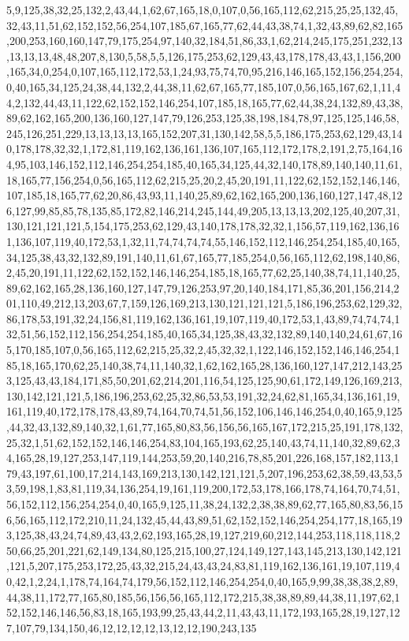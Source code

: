 5,9,125,38,32,25,132,2,43,44,1,62,67,165,18,0,107,0,56,165,112,62,215,25,25,132,45,32,43,11,51,62,152,152,56,254,107,185,67,165,77,62,44,43,38,74,1,32,43,89,62,82,165,200,253,160,160,147,79,175,254,97,140,32,184,51,86,33,1,62,214,245,175,251,232,13,13,13,13,48,48,207,8,130,5,58,5,5,126,175,253,62,129,43,43,178,178,43,43,1,156,200,165,34,0,254,0,107,165,112,172,53,1,24,93,75,74,70,95,216,146,165,152,156,254,254,0,40,165,34,125,24,38,44,132,2,44,38,11,62,67,165,77,185,107,0,56,165,167,62,1,11,44,2,132,44,43,11,122,62,152,152,146,254,107,185,18,165,77,62,44,38,24,132,89,43,38,89,62,162,165,200,136,160,127,147,79,126,253,125,38,198,184,78,97,125,125,146,58,245,126,251,229,13,13,13,13,165,152,207,31,130,142,58,5,5,186,175,253,62,129,43,140,178,178,32,32,1,172,81,119,162,136,161,136,107,165,112,172,178,2,191,2,75,164,164,95,103,146,152,112,146,254,254,185,40,165,34,125,44,32,140,178,89,140,140,11,61,18,165,77,156,254,0,56,165,112,62,215,25,20,2,45,20,191,11,122,62,152,152,146,146,107,185,18,165,77,62,20,86,43,93,11,140,25,89,62,162,165,200,136,160,127,147,48,126,127,99,85,85,78,135,85,172,82,146,214,245,144,49,205,13,13,13,202,125,40,207,31,130,121,121,121,5,154,175,253,62,129,43,140,178,178,32,32,1,156,57,119,162,136,161,136,107,119,40,172,53,1,32,11,74,74,74,74,55,146,152,112,146,254,254,185,40,165,34,125,38,43,32,132,89,191,140,11,61,67,165,77,185,254,0,56,165,112,62,198,140,86,2,45,20,191,11,122,62,152,152,146,146,254,185,18,165,77,62,25,140,38,74,11,140,25,89,62,162,165,28,136,160,127,147,79,126,253,97,20,140,184,171,85,36,201,156,214,201,110,49,212,13,203,67,7,159,126,169,213,130,121,121,121,5,186,196,253,62,129,32,86,178,53,191,32,24,156,81,119,162,136,161,19,107,119,40,172,53,1,43,89,74,74,74,132,51,56,152,112,156,254,254,185,40,165,34,125,38,43,32,132,89,140,140,24,61,67,165,170,185,107,0,56,165,112,62,215,25,32,2,45,32,32,1,122,146,152,152,146,146,254,185,18,165,170,62,25,140,38,74,11,140,32,1,62,162,165,28,136,160,127,147,212,143,253,125,43,43,184,171,85,50,201,62,214,201,116,54,125,125,90,61,172,149,126,169,213,130,142,121,121,5,186,196,253,62,25,32,86,53,53,191,32,24,62,81,165,34,136,161,19,161,119,40,172,178,178,43,89,74,164,70,74,51,56,152,106,146,146,254,0,40,165,9,125,44,32,43,132,89,140,32,1,61,77,165,80,83,56,156,56,165,167,172,215,25,191,178,132,25,32,1,51,62,152,152,146,146,254,83,104,165,193,62,25,140,43,74,11,140,32,89,62,34,165,28,19,127,253,147,119,144,253,59,20,140,216,78,85,201,226,168,157,182,113,179,43,197,61,100,17,214,143,169,213,130,142,121,121,5,207,196,253,62,38,59,43,53,53,59,198,1,83,81,119,34,136,254,19,161,119,200,172,53,178,166,178,74,164,70,74,51,56,152,112,156,254,254,0,40,165,9,125,11,38,24,132,2,38,38,89,62,77,165,80,83,56,156,56,165,112,172,210,11,24,132,45,44,43,89,51,62,152,152,146,254,254,177,18,165,193,125,38,43,24,74,89,43,43,2,62,193,165,28,19,127,219,60,212,144,253,118,118,118,250,66,25,201,221,62,149,134,80,125,215,100,27,124,149,127,143,145,213,130,142,121,121,5,207,175,253,172,25,43,32,215,24,43,43,24,83,81,119,162,136,161,19,107,119,40,42,1,2,24,1,178,74,164,74,179,56,152,112,146,254,254,0,40,165,9,99,38,38,38,2,89,44,38,11,172,77,165,80,185,56,156,56,165,112,172,215,38,38,89,89,44,38,11,197,62,152,152,146,146,56,83,18,165,193,99,25,43,44,2,11,43,43,11,172,193,165,28,19,127,127,107,79,134,150,46,12,12,12,12,13,12,12,190,243,135
